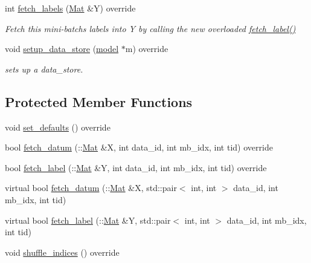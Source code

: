 \begin{DoxyCompactItemize}
int \hyperlink{classlbann_1_1data__reader__mnist__siamese_a1709140fcdcea9baaaf1bab7a48f3bce}{fetch\+\_\+labels} (\hyperlink{base_8hpp_a68f11fdc31b62516cb310831bbe54d73}{Mat} \&Y) override
\begin{DoxyCompactList}\small\item\em Fetch this mini-\/batch\textquotesingle{}s labels into Y by calling the new overloaded \hyperlink{classlbann_1_1data__reader__mnist__siamese_a0f4171af4c56100c1c78cb53e938222c}{fetch\+\_\+label()} \end{DoxyCompactList}\item 
void \hyperlink{classlbann_1_1data__reader__mnist__siamese_a410d8aa510fb2f3f4d1a257d5b308819}{setup\+\_\+data\+\_\+store} (\hyperlink{classlbann_1_1model}{model} $\ast$m) override
\begin{DoxyCompactList}\small\item\em sets up a data\+\_\+store. \end{DoxyCompactList}\end{DoxyCompactItemize}
\subsection*{Protected Member Functions}
\begin{DoxyCompactItemize}
\item 
void \hyperlink{classlbann_1_1data__reader__mnist__siamese_a7e1c9530b5d56a0835db8a30af980164}{set\+\_\+defaults} () override
\item 
bool \hyperlink{classlbann_1_1data__reader__mnist__siamese_a299dd32be165c5acf320b6f40404cb17}{fetch\+\_\+datum} (\+::\hyperlink{base_8hpp_a68f11fdc31b62516cb310831bbe54d73}{Mat} \&X, int data\+\_\+id, int mb\+\_\+idx, int tid) override
\item 
bool \hyperlink{classlbann_1_1data__reader__mnist__siamese_a0f4171af4c56100c1c78cb53e938222c}{fetch\+\_\+label} (\+::\hyperlink{base_8hpp_a68f11fdc31b62516cb310831bbe54d73}{Mat} \&Y, int data\+\_\+id, int mb\+\_\+idx, int tid) override
\item 
virtual bool \hyperlink{classlbann_1_1data__reader__mnist__siamese_a9124e72ab8d6913f5c90222ff0f45272}{fetch\+\_\+datum} (\+::\hyperlink{base_8hpp_a68f11fdc31b62516cb310831bbe54d73}{Mat} \&X, std\+::pair$<$ int, int $>$ data\+\_\+id, int mb\+\_\+idx, int tid)
\item 
virtual bool \hyperlink{classlbann_1_1data__reader__mnist__siamese_addb5a1f18e903d73a2c32125c90f4a1f}{fetch\+\_\+label} (\+::\hyperlink{base_8hpp_a68f11fdc31b62516cb310831bbe54d73}{Mat} \&Y, std\+::pair$<$ int, int $>$ data\+\_\+id, int mb\+\_\+idx, int tid)
\item 
void \hyperlink{classlbann_1_1data__reader__mnist__siamese_ad1949fc1a71af86d792e927c0181f87d}{shuffle\+\_\+indices} () override
\end{DoxyCompactItemize}
